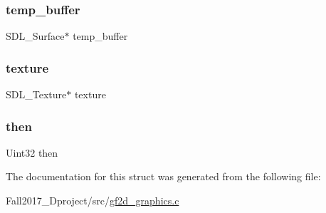 \subsubsection{\texorpdfstring{temp\+\_\+buffer}{temp\_buffer}}
{\footnotesize\ttfamily S\+D\+L\+\_\+\+Surface$\ast$ temp\+\_\+buffer}

\mbox{\label{struct_graphics_a859b8efbf9abe8e82757ee5c75a0c97c}} 
\subsubsection{\texorpdfstring{texture}{texture}}
{\footnotesize\ttfamily S\+D\+L\+\_\+\+Texture$\ast$ texture}

\mbox{\label{struct_graphics_a44ae6bd6838debc09ab2e58b992b9e3b}} 
\subsubsection{\texorpdfstring{then}{then}}
{\footnotesize\ttfamily Uint32 then}



The documentation for this struct was generated from the following file\+:\begin{DoxyCompactItemize}
\item 
Fall2017\+\_\+Dproject/src/\hyperlink{gf2d__graphics_8c}{gf2d\+\_\+graphics.\+c}\end{DoxyCompactItemize}
